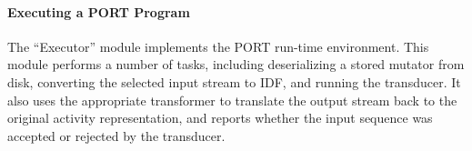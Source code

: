\paragraph{Executing a PORT Program}
The ``Executor'' module implements the PORT run-time environment.
This module performs a number of tasks, including deserializing a stored mutator from disk,
converting the selected input stream to IDF, and
running the transducer. It also
uses the appropriate transformer to translate the output stream back to the original activity representation, and reports whether the input sequence was
accepted or rejected by the transducer.

